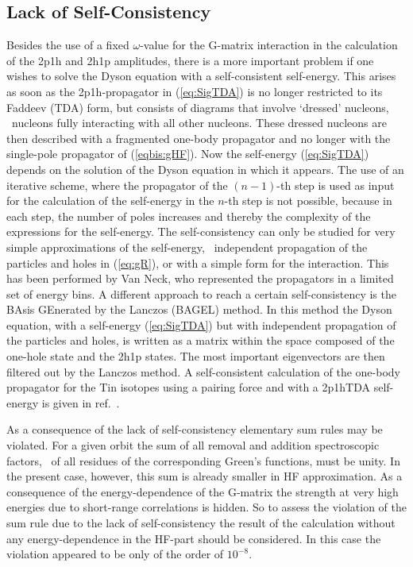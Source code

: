 \subsection{Lack of Self-Consistency}
Besides the use of a fixed $\omega$-value for the G-matrix interaction in the 
calculation of the 2p1h and 2h1p amplitudes, there is a more important problem 
if one wishes to solve the Dyson equation with a self-consistent self-energy. 
This arises as soon as the 2p1h-propagator in (\ref{eq:SigTDA}) is no longer 
restricted to its Faddeev (TDA) form, but consists of diagrams that involve
`dressed' nucleons, \ie\ nucleons fully interacting with all other nucleons.
These dressed nucleons are then described with a fragmented one-body propagator
and no longer with the single-pole propagator of (\ref{eqbis:gHF}).
Now the self-energy (\ref{eq:SigTDA}) depends on the solution of the 
Dyson equation in which it appears. The use of an iterative scheme, where the
propagator of the $(n-1)$-th step is used as input for the calculation of the
self-energy in the $n$-th step is not possible, because  in each step, 
the number of poles increases and thereby the complexity of 
the expressions for the self-energy.
The self-consistency can only be studied for very simple approximations of the self-energy, \eg\ independent propagation of the particles and holes in 
(\ref{eq:gR}), or with a simple form for the interaction.
This has been performed by 
Van Neck\cite{NWR91}, 
who represented the propagators in a limited set of energy bins.
A different approach to reach a certain self-consistency is the 
BAsis GEnerated by the Lanczos (BAGEL)\cite{MS93} method.
In this method the Dyson equation, with a self-energy (\ref{eq:SigTDA}) but 
with 
independent propagation of the particles and  holes, is written as a matrix 
within the space composed of
the one-hole state and the  2h1p states. The most important 
eigenvectors are then 
filtered out by the Lanczos method.
A self-consistent calculation of the one-body propagator 
for the Tin isotopes using a pairing force 
and with a 2p1hTDA 
self-energy 
is given in ref.~\cite{Yu94}.


As a consequence of the lack of self-consistency elementary sum rules may be 
violated. For a given orbit the sum of all removal and addition spectroscopic 
factors, \ie\ of all residues of the corresponding Green's functions, must be 
unity. In the present case, however, this sum is already smaller in HF 
approximation. As a consequence of 
the energy-dependence of the G-matrix the strength at 
very high energies due to short-range correlations is hidden. So to assess the 
violation of the sum rule due to the lack of self-consistency the result of 
the 
calculation without any energy-dependence in the HF-part should be considered.
In this case the violation appeared to be only of the order of $10^{-8}$.

